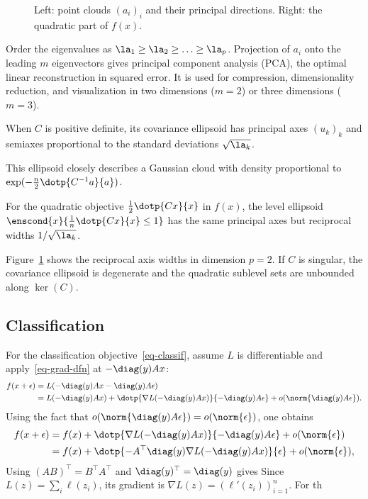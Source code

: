 \begin{figure}[tbp]
\centering
{}
\caption{Left: point clouds $(a_i)_i$ and their principal directions. Right: the quadratic part of $f(x)$.}
\label{fig-link-pca}
\end{figure}

Order the eigenvalues as $\la_1 \geq \la_2 \geq \ldots \geq \la_p$. Projection of $a_i$ onto the leading $m$ eigenvectors gives principal component analysis (PCA), the optimal linear reconstruction in squared error. It is used for compression, dimensionality reduction, and visualization in two dimensions ($m=2$) or three dimensions ($m=3$).

When $C$ is positive definite, its covariance ellipsoid has principal axes $(u_k)_k$ and semiaxes proportional to the standard deviations $\sqrt{\la_k}$.
 
This ellipsoid closely describes a Gaussian cloud with density proportional to $\exp(-\frac n2\dotp{C^{-1}a}{a})$.
 
For the quadratic objective $\frac{1}{2}\dotp{Cx}{x}$ in $f(x)$, the level ellipsoid $\enscond{x}{\frac{1}{n}\dotp{Cx}{x} \leq 1}$ has the same principal axes but reciprocal widths $1/\sqrt{\la_k}$.
 
Figure~\ref{fig-link-pca} shows the reciprocal axis widths in dimension $p=2$. If $C$ is singular, the covariance ellipsoid is degenerate and the quadratic sublevel sets are unbounded along $\ker(C)$.



                                                                                  
\subsection{Classification}

For the classification objective~\eqref{eq-classif}, assume $L$ is differentiable and apply~\eqref{eq-grad-dfn} at $-\diag(y) Ax$:
\begin{align*}
	f(x+\epsilon) &= L( -\diag(y) Ax -\diag(y)  A\epsilon) \\
	&= L(-\diag(y) Ax) + \dotp{\nabla L( -\diag(y) Ax)}{ -\diag(y)  A\epsilon } + o(\norm{\diag(y)  A\epsilon}).
\end{align*} 
Using the fact that $o(\norm{\diag(y)  A\epsilon}) = o(\norm{\epsilon})$, one obtains
\begin{align*}
	f(x+\epsilon) &= f(x) + \dotp{\nabla L( -\diag(y) Ax)}{-\diag(y)  A\epsilon} + o(\norm{\epsilon}) \\
		 &=  f(x) + \dotp{-A^\top \diag(y) \nabla L( -\diag(y) Ax)}{\epsilon} + o(\norm{\epsilon}), 
\end{align*} 	
Using $(AB)^\top = B^\top A^\top$ and $\diag(y)^\top=\diag(y)$ gives
Since $L(z)=\sum_i\ell(z_i)$, its gradient is $\nabla L(z)=(\ell'(z_i))_{i=1}^n$. For th
